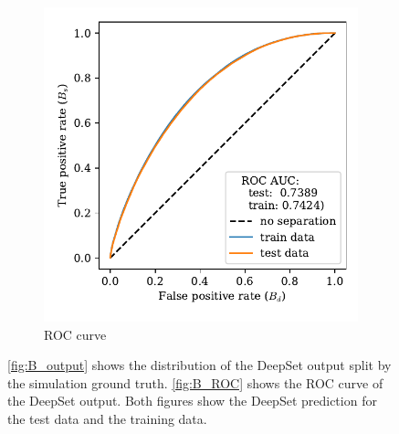 \begin{figure}
\begin{subfigure}{0.5\textwidth}
        \includegraphics[width=\textwidth]{images/B_ROC.pdf}
        \caption{ROC curve}
        \label{fig:B_ROC}
    \end{subfigure}%
    \caption{\autoref{fig:B_output} shows the distribution of the DeepSet output split by the simulation ground truth. \autoref{fig:B_ROC} shows the ROC curve of the DeepSet output. Both figures show the DeepSet prediction for the test data and the training data.}
\end{figure}
